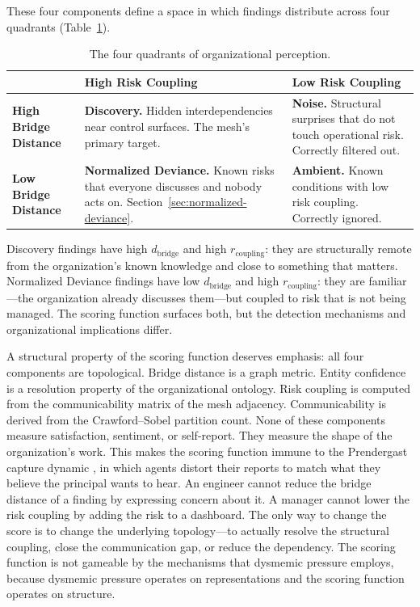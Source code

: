 \documentclass[11pt,a4paper]{article}
\begin{document}
These four components define a space in which findings distribute across four quadrants (Table~\ref{tab:quadrants}).

\begin{table}[ht]
\centering
\caption{The four quadrants of organizational perception.}
\label{tab:quadrants}
\begin{tabular}{@{}p{3.2cm}p{3.2cm}p{6.5cm}@{}}
\toprule
& \textbf{High Risk Coupling} & \textbf{Low Risk Coupling} \\
\midrule
\textbf{High Bridge Distance} & \textbf{Discovery.} Hidden interdependencies near control surfaces. The mesh's primary target. & \textbf{Noise.} Structural surprises that do not touch operational risk. Correctly filtered out. \\[8pt]
\textbf{Low Bridge Distance} & \textbf{Normalized Deviance.} Known risks that everyone discusses and nobody acts on. Section~\ref{sec:normalized-deviance}. & \textbf{Ambient.} Known conditions with low risk coupling. Correctly ignored. \\
\bottomrule
\end{tabular}
\end{table}

Discovery findings have high $d_{\text{bridge}}$ and high $r_{\text{coupling}}$: they are structurally remote from the organization's known knowledge and close to something that matters. Normalized Deviance findings have low $d_{\text{bridge}}$ and high $r_{\text{coupling}}$: they are familiar---the organization already discusses them---but coupled to risk that is not being managed. The scoring function surfaces both, but the detection mechanisms and organizational implications differ.

A structural property of the scoring function deserves emphasis: all four components are topological. Bridge distance is a graph metric. Entity confidence is a resolution property of the organizational ontology. Risk coupling is computed from the communicability matrix of the mesh adjacency. Communicability is derived from the Crawford--Sobel partition count. None of these components measure satisfaction, sentiment, or self-report. They measure the shape of the organization's work. This makes the scoring function immune to the Prendergast capture dynamic \citep{prendergast1993}, in which agents distort their reports to match what they believe the principal wants to hear. An engineer cannot reduce the bridge distance of a finding by expressing concern about it. A manager cannot lower the risk coupling by adding the risk to a dashboard. The only way to change the score is to change the underlying topology---to actually resolve the structural coupling, close the communication gap, or reduce the dependency. The scoring function is not gameable by the mechanisms that dysmemic pressure employs, because dysmemic pressure operates on representations and the scoring function operates on structure.
\end{document}

